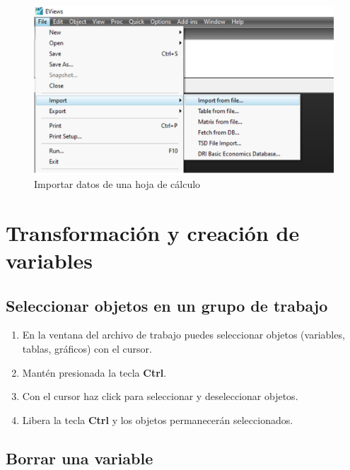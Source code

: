 \documentclass[
]{book}
\providecommand{\tightlist}{%
  \setlength{\itemsep}{0pt}\setlength{\parskip}{0pt}}
\begin{document}
\begin{figure}

{\centering \includegraphics[width=0.75\linewidth]{imagenes/3_2} 

}

\caption{Importar datos de una hoja de cálculo}\label{fig:unnamed-chunk-5}
\end{figure}

\hypertarget{transformaciuxf3n-y-creaciuxf3n-de-variables}{%
\section{Transformación y creación de variables}\label{transformaciuxf3n-y-creaciuxf3n-de-variables}}

\hypertarget{seleccionar-objetos-en-un-grupo-de-trabajo}{%
\subsection{Seleccionar objetos en un grupo de trabajo}\label{seleccionar-objetos-en-un-grupo-de-trabajo}}

\begin{enumerate}
\def\labelenumi{\arabic{enumi}.}
\tightlist
\item
  En la ventana del archivo de trabajo puedes seleccionar objetos (variables, tablas, gráficos) con el cursor.
\item
  Mantén presionada la tecla \textbf{Ctrl}.
\item
  Con el cursor haz click para seleccionar y deseleccionar objetos.
\item
  Libera la tecla \textbf{Ctrl} y los objetos permanecerán seleccionados.
\end{enumerate}

\hypertarget{borrar-una-variable}{%
\subsection{Borrar una variable}\label{borrar-una-variable}}
\end{document}
